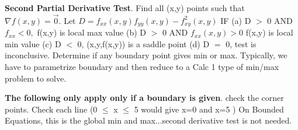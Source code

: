 \documentclass[10pt,landscape]{article}
\begin{document}
\begin{multicols*}{5}
\textbf{Second Partial Derivative Test}. Find all (x,y) points such that $ \nabla f(x,y) = \vec{0} $. Let $ D=f_{xx}(x,y)f_{yy}(x,y)-f_{xy}^2(x,y) $\newline
IF (a) D $>$ 0 AND $ f_{xx} < 0, $ f(x,y) is local max value\newline
(b) D $>$ 0 AND $f_{xx}(x,y) > 0$ f(x,y) is local min value\newline
(c) D $<$ 0, (x,y,f(x,y)) is a saddle point\newline
(d) D $=$ 0, test is inconclusive. Determine if any boundary point gives min or max. Typically, we have to parametrize boundary and then reduce to a Calc 1 type of min/max problem to solve.

\textbf{The following only apply only if a boundary is given}. check the corner points. Check each line (0 $\le$ x $\le$ 5 would give x=0 and x=5 )\newline
On Bounded Equations, this is the global min and max...second derivative test is not needed.

\end{multicols*}
\end{document}
